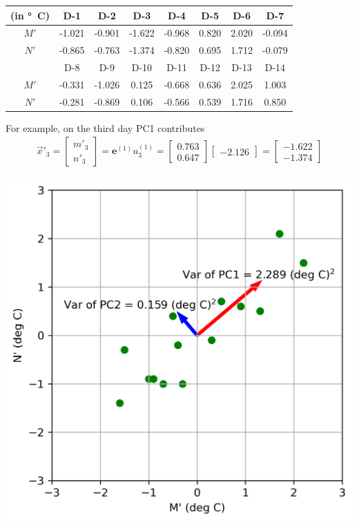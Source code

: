 \begin{solution}
\begin{center}
\begin{tabular}{|c|c|c|c|c|c|c|c|}
\hline
(in \si{\degree C}) & D-1 & D-2 & D-3 & D-4 & D-5 & D-6 & D-7 \\
\hline
$M'$ & -1.021 & -0.901 & -1.622 & -0.968 & 0.820 & 2.020 & -0.094 \\
\hline
$N'$ & -0.865 & -0.763 & -1.374 & -0.820 & 0.695 & 1.712 & -0.079 \\
\hline
 & D-8 & D-9 & D-10 & D-11 & D-12 & D-13 & D-14 \\
\hline
$M'$ & -0.331 & -1.026 & 0.125 & -0.668 & 0.636 & 2.025 & 1.003 \\
\hline
$N'$ & -0.281 & -0.869 & 0.106 & -0.566 & 0.539 & 1.716 & 0.850 \\
\hline
\end{tabular}
\end{center}
For example, on the third day PC1 contributes
\begin{align*}
\vec{x}'_3 =
\begin{bmatrix}
m'_3 \\
n'_3
\end{bmatrix}
=
\textbf{e}^{(1)}u_3^{(1)}
=
\begin{bmatrix}
0.763 \\
0.647
\end{bmatrix}
\begin{bmatrix}
-2.126
\end{bmatrix}
=
\begin{bmatrix}
-1.622 \\
-1.374  
\end{bmatrix}
\end{align*}
\begin{center}
\includegraphics[scale = 0.6]{graphics/PCA_exmp_1.png}\\

\end{center}
\end{solution}
